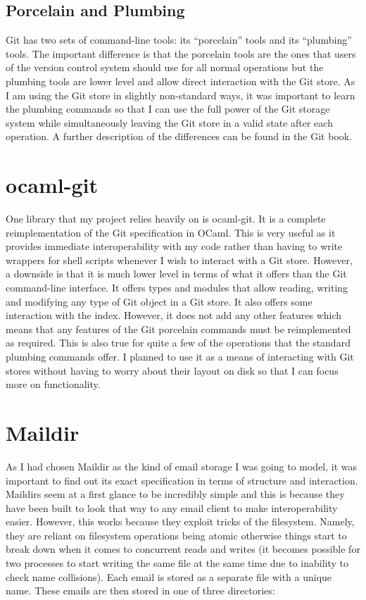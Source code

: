\subsection{Porcelain and Plumbing}

Git has two sets of command-line tools: its ``porcelain'' tools and its ``plumbing'' tools. The important difference is that the porcelain tools are the ones that users of the version control system should use for all normal operations but the plumbing tools are lower level and allow direct interaction with the Git store. As I am using the Git store in slightly non-standard ways, it was important to learn the plumbing commands so that I can use the full power of the Git storage system while simultaneously leaving the Git store in a valid state after each operation. A further description of the differences can be found in the Git book\cite{chacon2014git}.

\section{ocaml-git}

One library that my project relies heavily on is ocaml-git\cite{code_ocaml-git}. It is a complete reimplementation of the Git specification in OCaml. This is very useful as it provides immediate interoperability with my code rather than having to write wrappers for shell scripts whenever I wish to interact with a Git store. However, a downside is that it is much lower level in terms of what it offers than the Git command-line interface. It offers types and modules that allow reading, writing and modifying any type of Git object in a Git store. It also offers some interaction with the index. However, it does not add any other features which means that any features of the Git porcelain commands must be reimplemented as required. This is also true for quite a few of the operations that the standard plumbing commands offer. I planned to use it as a means of interacting with Git stores without having to worry about their layout on disk so that I can focus more on functionality.

\section{Maildir}

As I had chosen Maildir as the kind of email storage I was going to model, it was important to find out its exact specification in terms of structure and interaction. Maildirs seem at a first glance to be incredibly simple and this is because they have been built to look that way to any email client to make interoperability easier. However, this works because they exploit tricks of the filesystem. Namely, they are reliant on filesystem operations being atomic otherwise things start to break down when it comes to concurrent reads and writes (it becomes possible for two processes to start writing the same file at the same time due to inability to check name collisions).
Each email is stored as a separate file with a unique name. These emails are then stored in one of three directories:

